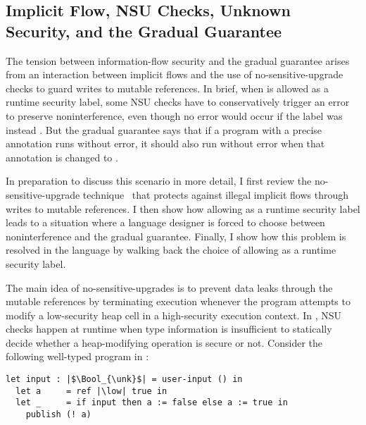 \subsection{Implicit Flow, NSU Checks, Unknown Security, and the Gradual Guarantee}
\label{sec:example2}


The tension between information-flow security and the gradual guarantee arises
from an interaction between implicit flows and the use of no-sensitive-upgrade
checks to guard writes to mutable references. In brief, when \unk is allowed as
a runtime security label, some NSU checks have to conservatively trigger an
error to preserve noninterference, even though no error would occur if the label
was instead \high. But the gradual guarantee says that if a program with a
precise annotation runs without error, it should also run without error when
that annotation is changed to \unk.

In preparation to discuss this scenario in more detail, I first review the
no-sensitive-upgrade technique~\parencite{austin2009efficient} that protects against
illegal implicit flows through writes to mutable references. I then show how
allowing \unk as a runtime security label leads to a situation where a language
designer is forced to choose between noninterference and the gradual guarantee.
Finally, I show how this problem is resolved in the \Surface language by walking
back the choice of allowing \unk as a runtime security label.

The main idea of no-sensitive-upgrades is to prevent data leaks through the
mutable references by terminating execution whenever the program attempts to
modify a low-security heap cell in a high-security execution context. In
\Surface, NSU checks happen at runtime when type information is insufficient to
statically decide whether a heap-modifying operation is secure or not. Consider
the following well-typed program in \Surface:

\begin{lstlisting}[style=tt]
  let input : |$\Bool_{\unk}$| = user-input () in
  let a     = ref |\low| true in
  let _     = if input then a := false else a := true in
    publish (! a)
\end{lstlisting}

